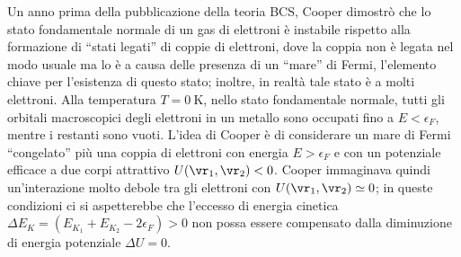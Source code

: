 Un anno prima della pubblicazione della teoria BCS, Cooper dimostrò che lo stato fondamentale normale di un gas di elettroni è instabile rispetto alla formazione di ``stati legati'' di coppie di elettroni, dove la coppia non è legata nel modo usuale ma lo è a causa delle presenza di un ``mare'' di Fermi, l'elemento chiave per l'esistenza di questo stato; inoltre, in realtà tale stato è a molti elettroni. Alla temperatura $T = \SI{0}{\kelvin}$, nello stato fondamentale normale, tutti gli orbitali macroscopici degli elettroni in un metallo sono occupati fino a $E < \epsilon_F$, mentre i restanti sono vuoti. L'idea di Cooper è di considerare un mare di Fermi ``congelato'' più una coppia di elettroni con energia $E > \epsilon_F$ e con un potenziale efficace a due corpi attrattivo $U(\vr_1,\vr_2) < 0$. Cooper immaginava quindi un'interazione molto debole tra gli elettroni con $U(\vr_1,\vr_2) \simeq 0$; in queste condizioni ci si aspetterebbe che l'eccesso di energia cinetica $\Delta E_K = (E_{K_1} + E_{K_2} -2\epsilon_F) > 0$ non possa essere compensato dalla diminuzione di energia potenziale $\Delta U = 0$. 

